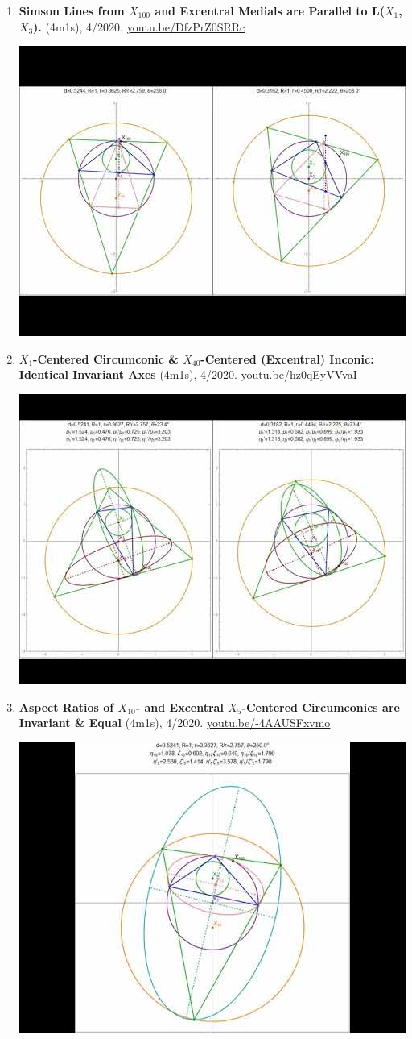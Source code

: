 \documentclass[12pt]{article}
\begin{document}
\begin{enumerate}[resume]
% 
\item \textbf{Simson Lines from $X_{100}$ and Excentral Medials are Parallel to L($X_{1}$, $X_{3}$).} (4m1s), 4/2020. \href{https://youtu.be/DfzPrZ0SRRc}{\url{youtu.be/DfzPrZ0SRRc}}
\begin{center}\includegraphics[width=.5\textwidth]{pics/DfzPrZ0SRRc.jpg}\end{center}
% 
\item \textbf{$X_{1}$-Centered Circumconic \& $X_{40}$-Centered (Excentral) Inconic: Identical Invariant Axes} (4m1s), 4/2020. \href{https://youtu.be/hz0qEyVVvaI}{\url{youtu.be/hz0qEyVVvaI}}
\begin{center}\includegraphics[width=.5\textwidth]{pics/hz0qEyVVvaI.jpg}\end{center}
% 
\item \textbf{Aspect Ratios of $X_{10}$- and Excentral $X_{5}$-Centered Circumconics are Invariant \& Equal} (4m1s), 4/2020. \href{https://youtu.be/-4AAUSFxvmo}{\url{youtu.be/-4AAUSFxvmo}}
\begin{center}\includegraphics[width=.5\textwidth]{pics/-4AAUSFxvmo.jpg}\end{center}

\end{enumerate}
\end{document}
